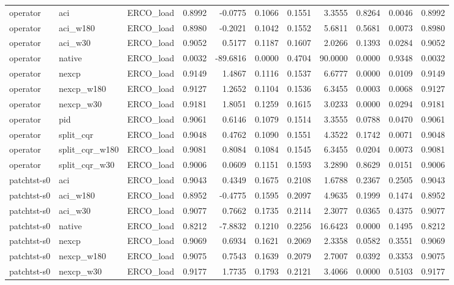 \begin{tabular}{lllrrrrrrrr}
operator & aci & ERCO_load & 0.8992 & -0.0775 & 0.1066 & 0.1551 & 3.3555 & 0.8264 & 0.0046 & 0.8992 \\
operator & aci_w180 & ERCO_load & 0.8980 & -0.2021 & 0.1042 & 0.1552 & 5.6811 & 0.5681 & 0.0073 & 0.8980 \\
operator & aci_w30 & ERCO_load & 0.9052 & 0.5177 & 0.1187 & 0.1607 & 2.0266 & 0.1393 & 0.0284 & 0.9052 \\
operator & native & ERCO_load & 0.0032 & -89.6816 & 0.0000 & 0.4704 & 90.0000 & 0.0000 & 0.9348 & 0.0032 \\
operator & nexcp & ERCO_load & 0.9149 & 1.4867 & 0.1116 & 0.1537 & 6.6777 & 0.0000 & 0.0109 & 0.9149 \\
operator & nexcp_w180 & ERCO_load & 0.9127 & 1.2652 & 0.1104 & 0.1536 & 6.3455 & 0.0003 & 0.0068 & 0.9127 \\
operator & nexcp_w30 & ERCO_load & 0.9181 & 1.8051 & 0.1259 & 0.1615 & 3.0233 & 0.0000 & 0.0294 & 0.9181 \\
operator & pid & ERCO_load & 0.9061 & 0.6146 & 0.1079 & 0.1514 & 3.3555 & 0.0788 & 0.0470 & 0.9061 \\
operator & split_cqr & ERCO_load & 0.9048 & 0.4762 & 0.1090 & 0.1551 & 4.3522 & 0.1742 & 0.0071 & 0.9048 \\
operator & split_cqr_w180 & ERCO_load & 0.9081 & 0.8084 & 0.1084 & 0.1545 & 6.3455 & 0.0204 & 0.0073 & 0.9081 \\
operator & split_cqr_w30 & ERCO_load & 0.9006 & 0.0609 & 0.1151 & 0.1593 & 3.2890 & 0.8629 & 0.0151 & 0.9006 \\
patchtst-s0 & aci & ERCO_load & 0.9043 & 0.4349 & 0.1675 & 0.2108 & 1.6788 & 0.2367 & 0.2505 & 0.9043 \\
patchtst-s0 & aci_w180 & ERCO_load & 0.8952 & -0.4775 & 0.1595 & 0.2097 & 4.9635 & 0.1999 & 0.1474 & 0.8952 \\
patchtst-s0 & aci_w30 & ERCO_load & 0.9077 & 0.7662 & 0.1735 & 0.2114 & 2.3077 & 0.0365 & 0.4375 & 0.9077 \\
patchtst-s0 & native & ERCO_load & 0.8212 & -7.8832 & 0.1210 & 0.2256 & 16.6423 & 0.0000 & 0.1495 & 0.8212 \\
patchtst-s0 & nexcp & ERCO_load & 0.9069 & 0.6934 & 0.1621 & 0.2069 & 2.3358 & 0.0582 & 0.3551 & 0.9069 \\
patchtst-s0 & nexcp_w180 & ERCO_load & 0.9075 & 0.7543 & 0.1639 & 0.2079 & 2.7007 & 0.0392 & 0.3353 & 0.9075 \\
patchtst-s0 & nexcp_w30 & ERCO_load & 0.9177 & 1.7735 & 0.1793 & 0.2121 & 3.4066 & 0.0000 & 0.5103 & 0.9177 \\

\end{tabular}
